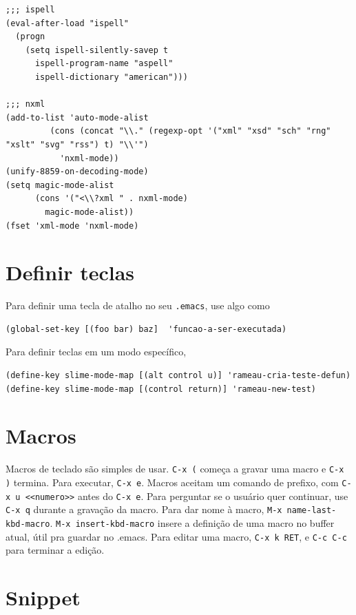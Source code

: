 \documentclass[12pt,brazil]{book}
\begin{document}
\begin{verbatim}
;;; ispell
(eval-after-load "ispell"
  (progn
    (setq ispell-silently-savep t
	  ispell-program-name "aspell"
	  ispell-dictionary "american")))

;;; nxml
(add-to-list 'auto-mode-alist
	     (cons (concat "\\." (regexp-opt '("xml" "xsd" "sch" "rng" "xslt" "svg" "rss") t) "\\'")
		   'nxml-mode))
(unify-8859-on-decoding-mode)
(setq magic-mode-alist
      (cons '("<\\?xml " . nxml-mode)
	    magic-mode-alist))
(fset 'xml-mode 'nxml-mode)
\end{verbatim}

\section{Definir teclas}
\label{sec:teclas}

Para definir uma tecla de atalho no seu \texttt{.emacs}, use algo como

\begin{verbatim}
(global-set-key [(foo bar) baz]  'funcao-a-ser-executada)
\end{verbatim}

Para definir teclas em um modo específico,

\begin{verbatim}
(define-key slime-mode-map [(alt control u)] 'rameau-cria-teste-defun)
(define-key slime-mode-map [(control return)] 'rameau-new-test)
\end{verbatim}

\section{Macros}
\label{sec:macros}

Macros de teclado são simples de usar. \texttt{C-x (} começa a gravar
uma macro e \texttt{C-x )} termina. Para executar, \texttt{C-x
  e}. Macros aceitam um comando de prefixo, com \texttt{C-x u
  <<numero>>} antes do \texttt{C-x e}. Para perguntar se o usuário
quer continuar, use \texttt{C-x q} durante a gravação da macro. Para
dar nome à macro, \texttt{M-x name-last-kbd-macro}. \texttt{M-x
  insert-kbd-macro} insere a definição de uma macro no buffer atual,
útil pra guardar no .emacs. Para editar uma macro, \texttt{C-x k RET},
e \texttt{C-c C-c} para terminar a edição.

\section{Snippet}
\label{sec:snippet}
\end{document}

